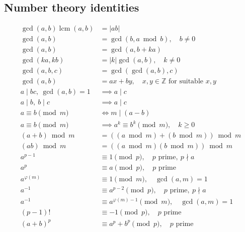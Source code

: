 \subsection{Number theory identities}

\begin{align*}
\gcd(a,b)\operatorname{lcm}(a,b) &= |ab|\\
\gcd(a,b) &= \gcd(b,a\bmod b),\quad b\ne0\\
\gcd(a,b) &= \gcd(a,b+ka)\\
\gcd(ka,kb) &= |k|\gcd(a,b),\quad k\ne0\\
\gcd(a,b,c) &= \gcd(\gcd(a,b),c)\\
\gcd(a,b) &= ax+by,\quad x,y\in\mathbb Z
\text{ for suitable }x,y\\
a\mid bc,\ \gcd(a,b)=1 &\implies a\mid c\\
a\mid b,\ b\mid c &\implies a\mid c\\
a\equiv b\pmod m &\iff m\mid(a-b)\\
a\equiv b\pmod m &\implies
a^k\equiv b^k\pmod m,\quad k\ge0\\
(a+b)\bmod m
&= ((a\bmod m)+(b\bmod m))\bmod m\\
(ab)\bmod m
&= ((a\bmod m)(b\bmod m))\bmod m\\
a^{p-1} &\equiv1\pmod p,\quad p\text{ prime},\ p\nmid a\\
a^p &\equiv a\pmod p,\quad p\text{ prime}\\
a^{\varphi(m)} &\equiv1\pmod m,\quad\gcd(a,m)=1\\
a^{-1} &\equiv a^{p-2}\pmod p,\quad p\text{ prime},\ p\nmid a\\
a^{-1} &\equiv a^{\varphi(m)-1}\pmod m,\quad\gcd(a,m)=1\\
(p-1)! &\equiv -1\pmod p,\quad p\text{ prime}\\
(a+b)^p &\equiv a^p+b^p\pmod p,\quad p\text{ prime}
\end{align*}

